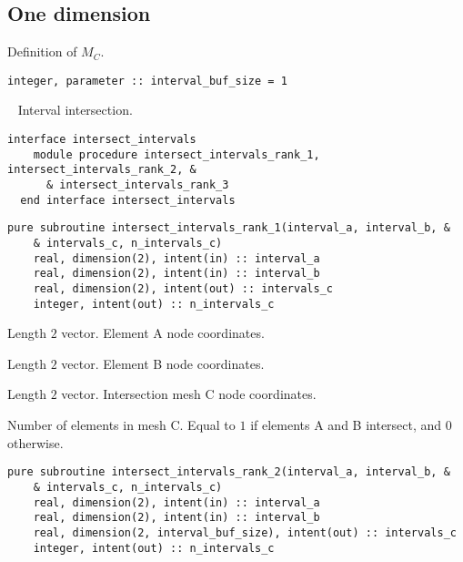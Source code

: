\documentclass{article}
\begin{document}
\subsection{One dimension}\label{sect:1D_intersection}

Definition of $M_C$.
  
\begin{lstlisting}[language=FORTRAN] 
  integer, parameter :: interval_buf_size = 1
\end{lstlisting}

~\newline
Interval intersection.
  
\begin{lstlisting}[language=FORTRAN]    
  interface intersect_intervals
    module procedure intersect_intervals_rank_1, intersect_intervals_rank_2, &
      & intersect_intervals_rank_3
  end interface intersect_intervals
\end{lstlisting}

\begin{lstlisting}[language=FORTRAN]   
  pure subroutine intersect_intervals_rank_1(interval_a, interval_b, &
    & intervals_c, n_intervals_c)
    real, dimension(2), intent(in) :: interval_a
    real, dimension(2), intent(in) :: interval_b
    real, dimension(2), intent(out) :: intervals_c
    integer, intent(out) :: n_intervals_c
\end{lstlisting} 

\begin{description}[font=\ttfamily\bfseries,leftmargin=2.2\parindent,labelindent=1.7\parindent,noitemsep]
  \item[interval\_a] Length $2$ vector. Element A node coordinates.
  \item[interval\_b] Length $2$ vector. Element B node coordinates.
  \item[interval\_c] Length $2$ vector. Intersection mesh C node coordinates.
  \item[n\_intervals\_c] Number of elements in mesh C. Equal to $1$ if elements
    A and B intersect, and $0$ otherwise.
\end{description}
  
\begin{lstlisting}[language=FORTRAN]   
  pure subroutine intersect_intervals_rank_2(interval_a, interval_b, &
    & intervals_c, n_intervals_c)
    real, dimension(2), intent(in) :: interval_a
    real, dimension(2), intent(in) :: interval_b
    real, dimension(2, interval_buf_size), intent(out) :: intervals_c
    integer, intent(out) :: n_intervals_c
\end{lstlisting} 
\end{document}
